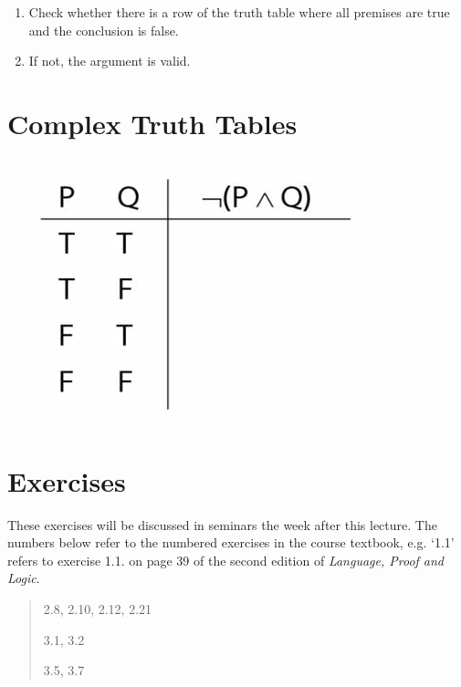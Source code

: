 \documentclass[12pt]{extarticle}
\begin{document}
\begin{multicols*}{3}
\begin{minipage}{\columnwidth}
\begin{enumerate}
\item Check whether there is a row of the truth table where all premises are true and the conclusion is false.
 
\item If not, the argument is valid.
 
\end{enumerate}
 
\end{minipage}
 
 
 
\section{Complex Truth Tables}
 
\begin{center}
\includegraphics[scale=0.3]{img/unit_60_tt.png}
\end{center}
\vfill
\begin{minipage}{\columnwidth}
\section{Exercises}
These exercises will be discussed in seminars the week after this lecture.
The numbers below refer to the numbered exercises in the course textbook, e.g. `1.1' refers to exercise 1.1. on page 39 of the second edition of \emph{Language, Proof and Logic}.
 
\begin{quote}
2.8, 2.10, 2.12, 2.21
 
3.1, 3.2
 
3.5, 3.7
 
\end{quote}
\end{minipage}



 


\end{multicols*}
\end{document}
